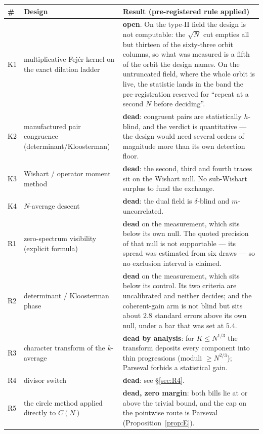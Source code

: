 \documentclass[11pt,a4paper]{article}
\theoremstyle{plain}
\theoremstyle{definition}
\begin{document}
\begin{longtable}{p{}p{}p{}}
\hline
\# & Design & Result (pre-registered rule applied)\\
\hline
\endhead
K1 & multiplicative Fej\'er kernel on the exact dilation ladder &
 \textbf{open}. On the type-II field the design is not computable: the
 $\sqrt N$ cut empties all but thirteen of the sixty-three orbit
 columns, so what was measured is a fifth of the orbit the design
 names. On the untruncated field, where the whole orbit is live, the
 statistic lands in the band the pre-registration reserved for
 ``repeat at a second $N$ before deciding''.\\
K2 & manufactured pair congruence (determinant/Kloosterman) &
 \textbf{dead}: congruent pairs are statistically $h$-blind, and the
 verdict is quantitative --- the design would need several orders of
 magnitude more than its own detection floor.\\
K3 & Wishart / operator moment method &
 \textbf{dead}: the second, third and fourth traces sit on the Wishart
 null. No sub-Wishart surplus to fund the exchange.\\
K4 & $N$-average descent &
 \textbf{dead}: the dual field is $\delta$-blind and
 $m$-uncorrelated.\\
R1 & zero-spectrum visibility (explicit formula) &
 \textbf{dead} on the measurement, which sits below its own null. The
 quoted precision of that null is not supportable --- its spread was
 estimated from six draws --- so no exclusion interval is claimed.\\
R2 & determinant / Kloosterman phase &
 \textbf{dead} on the measurement, which sits below its control. Its
 two criteria are uncalibrated and neither decides; and the
 coherent-gain arm is not blind but sits about $2.8$ standard errors
 above its own null, under a bar that was set at $5.4$.\\
R3 & character transform of the $k$-average &
 \textbf{dead by analysis}: for $K \le N^{1/3}$ the transform deposits
 every component into thin progressions (moduli $\ge N^{2/3}$);
 Parseval forbids a statistical gain.\\
R4 & divisor switch &
 \textbf{dead}: see \S\ref{sec:R4}.\\
R5 & the circle method applied directly to $C(N)$ &
 \textbf{dead, zero margin}: both bills lie at or above the trivial
 bound, and the cap on the pointwise route is Parseval
 (Proposition~\ref{prop:E}).\\
\hline
\end{longtable}
\end{document}
